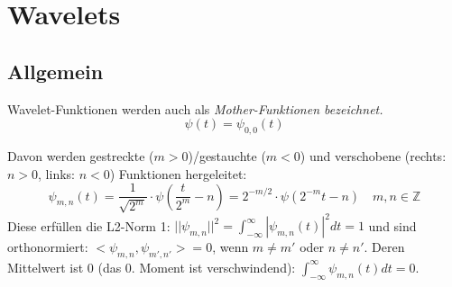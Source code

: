 \section{Wavelets}
\subsection{Allgemein }
  Wavelet-Funktionen werden auch als \em Mother-Funktionen \em bezeichnet.
  \[
    \psi(t) = \psi_{0,0}(t)
  \]
 
  Davon werden gestreckte ($m>0$)/gestauchte ($m<0$) und verschobene (rechts: $n > 0$, links: $n < 0$) Funktionen hergeleitet:
  \[  
    \psi_{m,n}(t)=\frac{1}{\sqrt{2^m}} \cdot \psi\left(\frac{t}{2^m} - n\right) = 2^{-m/2} \cdot \psi(2^{-m}t-n) \quad m,n \in \mathbb{Z}
  \]
  Diese erfüllen die L2-Norm 1: $|| \psi_{m,n} ||^2 = \int_{-\infty}^{\infty} |\psi_{m,n}(t)|^2 dt = 1$ und sind orthonormiert: $<\psi_{m,n}, \psi_{m',n'}> = 0$, wenn $m \neq m'$ oder $n \neq n'$. Deren Mittelwert ist 0 (das 0. Moment ist verschwindend): $\int_{-\infty}^{\infty} \psi_{m,n}(t) dt = 0$.

